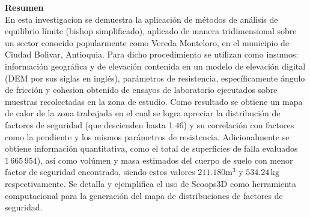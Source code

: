 \newpage
\textbf{\LARGE Resumen}\\
En esta investigacion se demuestra la aplicaci\'on de m\'etodos de an\'alisis de equilibrio l\'imite (bishop simplificado), aplicado de manera tridimensional sobre un sector conocido popularmente como Vereda Monteloro, en el municipio de Ciudad Bolivar, Antioquia. Para dicho procedimiento se utilizan como insumos: informaci\'on geogr\'afica y de elevaci\'on contenida en un modelo de elevaci\'on digital (DEM por sus siglas en ingl\'es), par\'ametros de resistencia, espec\'ificamente \'angulo de fricci\'on y cohesion obtenido de ensayos de laboratorio ejecutados sobre muestras recolectadas en la zona de estudio. Como resultado se obtiene un mapa de calor de la zona trabajada en el cual se logra apreciar la distribuci\'on de factores de seguridad (que descienden hasta 1.46) y su correlaci\'on con factores como la pendiente y los mismos par\'ametros de resistencia. Adicionalmente se obtiene informaci\'on quantitativa, como el total de superficies de falla evaluados \(1\,665\,954\)), as\'i como  vol\'umen y masa estimados del cuerpo de suelo con menor factor de seguridad encontrado, siendo estos valores $211.180\text{m}^{3}$ y $534.24\,\text{kg}$ respectivamente.
Se detalla y ejemplifica el uso de Scoops3D como herramienta computacional para la generaci\'on del mapa de distribuciones de factores de seguridad. 
\\\\
